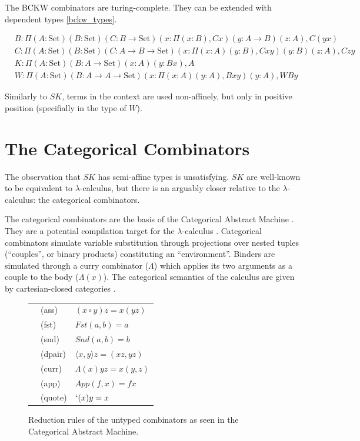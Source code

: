 \documentclass{article}
\newcommand{\set}{\mathrm{Set}}
\begin{document}
The BCKW combinators are turing-complete. They can be extended with dependent types \eqref{bckw_types}.

\begin{equation}
\begin{split}\label{bckw_types}
  &B : \Pi (A : \set) (B : \set) (C : B \rightarrow \set) (x : \Pi (x : B), C x) (y : A \rightarrow B) (z : A), C (y x) \\
  &C : \Pi (A : \set) (B : \set) (C : A \rightarrow B \rightarrow \set) (x : \Pi (x : A) (y : B), C x y) (y : B) (z : A), C z y \\
  &K : \Pi (A : \set) (B : A \rightarrow \set) (x : A) (y : B x), A \\
  &W : \Pi (A : \set) (B : A \rightarrow A \rightarrow \set) (x : \Pi (x : A) (y : A), B x y) (y : A), W B y
\end{split}
\end{equation}

Similarly to \(SK\), terms in the context are used non-affinely, but only in positive position (specifially in the type of \(W\)).

\section{The Categorical Combinators}

The observation that \(SK\) has semi-affine types is unsatisfying. \(SK\) are well-known to be equivalent to \(\lambda\)-calculus, but there is an arguably closer relative to the \(\lambda\)-calculus: the categorical combinators.

The categorical combinators \autocite{CURIEN1986188} are the basis of the Categorical Abstract Machine \autocite{cmachine}. They are a potential compilation target for the \(\lambda\)-calculus \autocite{cmachine}. Categorical combinators simulate variable substitution through projections over nested tuples (``couples'', or binary products) constituting an ``environment''. Binders are simulated through a curry combinator (\(\Lambda\)) which applies its two arguments as a couple to the body (\(\Lambda(x)\)). The categorical semantics of the calculus are given by cartesian-closed categories \autocite[p. 178]{cmachine}.

\begin{figure}[H]
\begin{center}
\begin{tabular}{l l l}\label{red_untyped_cat}
&(ass) & \((x \circ y) z = x(y z)\) \\
&(fst) & \(Fst(a, b) = a\) \\
&(snd) & \(Snd(a, b) = b\) \\
&(dpair) & \(\langle x, y\rangle z = (x z, y z)\) \\
&(curr) & \(\Lambda(x)yz = x(y, z)\) \\
&(app) & \(App(f, x) = f x\) \\
&(quote) & \(`(x) y = x\)
\end{tabular}
\end{center}
\caption{Reduction rules of the untyped combinators as seen in the Categorical Abstract Machine.}
\end{figure}
\end{document}
